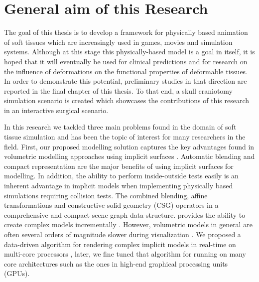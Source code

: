 

\label{chapter:introduction}
\section{General aim of this Research}
The goal of this thesis is to develop a framework for physically based animation of soft tissues which are increasingly used in
games, movies and simulation systems. Although at this stage this physically-based model is a goal in itself, it is hoped that
it will eventually be used for clinical predictions and for research on the influence of deformations on the functional properties 
of deformable tissues. In order to demonstrate this potential, preliminary studies in that direction are reported in the final chapter
of this thesis. To that end, a skull craniotomy simulation scenario is created which showcases the contributions of this research in an
interactive surgical scenario. 

In this research we tackled three main problems found in the domain of soft tissue simulation and has been the topic of interest for many
researchers in the field. First, our proposed modelling solution captures the key advantages found in volumetric modelling approaches using 
implicit surfaces \cite{Bloomenthal1997, Wyvill1986, Wyvill1999, Wyvill1996, Wyvill1997, Schmidt2006, Bernhardt2010a}. Automatic blending and compact 
representation are the major benefits of using implicit surfaces for modelling. In addition, the ability to perform inside-outside tests 
easily is an inherent advantage in implicit models when implementing physically based simulations requiring collision tests. 
The \blob \cite{Wyvill1999} combined blending, affine transformations and constructive solid geometry (CSG) operators in a 
comprehensive and compact scene graph data-structure. \blob provides the ability to create complex models incrementally \cite{Schmidt2006}. 
However, volumetric models in general are often several orders of magnitude slower during visualization \cite{Bloomenthal1990a, Bloomenthal1997}.
We proposed a data-driven algorithm for rendering complex implicit models in real-time on multi-core processors \cite{Shirazian2012}, later, we 
fine tuned that algorithm for running on many core architectures such as the ones in high-end graphical processing units (GPUs). 

